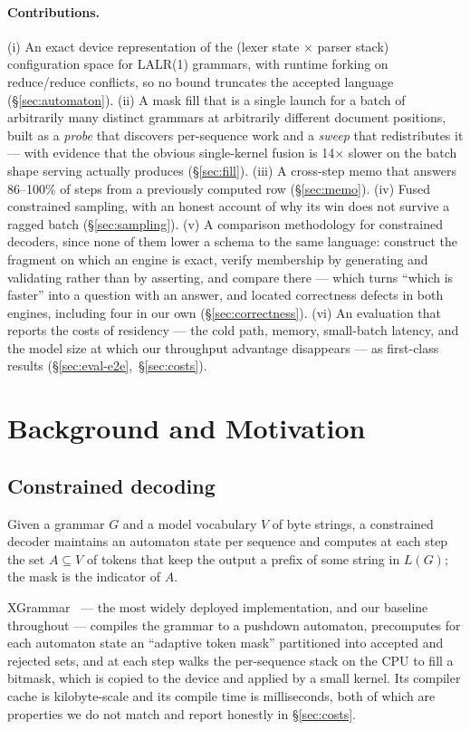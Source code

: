 \documentclass{article}
\begin{document}
\paragraph{Contributions.} (i) An exact device representation of the (lexer
state $\times$ parser stack) configuration space for LALR(1) grammars, with
runtime forking on reduce/reduce conflicts, so no bound truncates the accepted
language (\S\ref{sec:automaton}). (ii) A mask fill that is a single launch for
a batch of arbitrarily many distinct grammars at arbitrarily different document
positions, built as a \emph{probe} that discovers per-sequence work and a
\emph{sweep} that redistributes it --- with evidence that the obvious
single-kernel fusion is 14$\times$ slower on the batch shape serving actually
produces (\S\ref{sec:fill}). (iii) A cross-step memo that answers 86--100\% of
steps from a previously computed row (\S\ref{sec:memo}). (iv) Fused
constrained sampling, with an honest account of why its win does not survive a
ragged batch (\S\ref{sec:sampling}). (v) A comparison methodology for
constrained decoders, since none of them lower a schema to the same language:
construct the fragment on which an engine is exact, verify membership by
generating and validating rather than by asserting, and compare there --- which
turns ``which is faster'' into a question with an answer, and located
correctness defects in both engines, including four in our own
(\S\ref{sec:correctness}). (vi) An evaluation that reports the costs of
residency --- the cold path, memory, small-batch latency, and the model size at
which our throughput advantage disappears --- as first-class results
(\S\ref{sec:eval-e2e},~\S\ref{sec:costs}).

\section{Background and Motivation}
\label{sec:background}

\subsection{Constrained decoding}

Given a grammar $G$ and a model vocabulary $V$ of byte strings, a constrained
decoder maintains an automaton state per sequence and computes at each step the
set $A \subseteq V$ of tokens that keep the output a prefix of some string in
$L(G)$; the mask is the indicator of $A$.

XGrammar~\cite{dong2024xgrammar} --- the most widely deployed implementation,
and our baseline throughout --- compiles the grammar to a pushdown automaton,
precomputes for each automaton state an ``adaptive token mask'' partitioned into
accepted and rejected sets, and at each step walks the per-sequence stack on the
CPU to fill a bitmask, which is copied to the device and applied by a small
kernel. Its compiler cache is kilobyte-scale and its compile time is
milliseconds, both of which are properties we do not match and report honestly
in \S\ref{sec:costs}.
\end{document}
